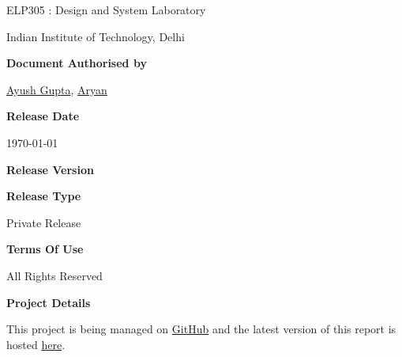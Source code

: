 \begin{titlepage}
{				\par
            }
            \vskip0.15in
             {
				\fontsize{16}{16}
				\sffamily
                ELP305 : Design and System Laboratory
				\par
            }
            \vskip0.15in
             {
				\fontsize{16}{14}
				\sffamily
                Indian Institute of Technology, Delhi	
                \par
            }
    \vspace{1.0in}
    {
        \normalsize
        \sffamily
        \textbf{\textcolor{tuberlindarkgray}{Document Authorised by}}\par \vspace{0.125cm}
        {\href{https://www.linkedin.com/in/ayush-gupta-undergraduate/}{Ayush Gupta}, \href{www.linkedin.com}{Aryan}}

        \vspace{0.25cm}
        \textbf{\textcolor{tuberlindarkgray}{Release Date}}\par \vspace{0.125cm}
        {\today}

        \vspace{0.25cm}
        \textbf{\textcolor{tuberlindarkgray}{Release Version}}\par \vspace{0.125cm}
        \textbf{}

        \vspace{0.25cm}
        \textbf{\textcolor{tuberlindarkgray}{Release Type}}\par \vspace{0.125cm}
        {Private Release}

        \vspace{0.25cm}
        \textbf{\textcolor{tuberlindarkgray}{Terms Of Use}}\par \vspace{0.125cm}
        {All Rights Reserved}

        \vspace{0.25cm}
        \textbf{\textcolor{tuberlindarkgray}{Project Details}}\par \vspace{0.125cm}
        {This project is being managed on \href{https://github.com/ELP305-Cleaning-Machine}{GitHub} and the latest version of this report is hosted \href{https://2nav.github.io/TribeC/}{here}.}
    }
\end{titlepage}
\afterpage{\restoregeometry}    
